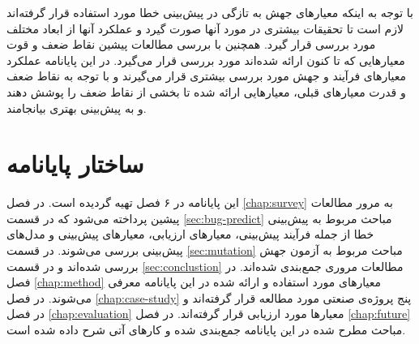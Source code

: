 با توجه به اینکه معیارهای جهش به تازگی در پیش‌بینی خطا مورد استفاده قرار گرفته‌اند لازم است تا تحقیقات بیشتری در مورد آنها صورت گیرد و عملکرد آنها از ابعاد مختلف مورد بررسی قرار گیرد. همچنین با بررسی مطالعات پیشین نقاط ضعف و قوت معیارهایی که تا کنون ارائه شده‌اند مورد بررسی قرار می‌گیرد. در این پایانامه عملکرد معیارهای فرآیند و جهش مورد بررسی بیشتری قرار می‌گیرند و با توجه به نقاط ضعف و قدرت معیارهای قبلی، معیارهایی ارائه شده تا بخشی از نقاط ضعف را پوشش دهند و به پیش‌بینی بهتری بیانجامند. 
\section{ساختار پایانامه}

این پایانامه در ۶ فصل تهیه گردیده است. در فصل \ref{chap:survey} به مرور مطالعات پیشین پرداخته می‌شود که در  قسمت \ref{sec:bug-predict}  مباحث مربوط به پیش‌بینی خطا از جمله فرآیند پیش‌بینی، معیارهای ارزیابی، معیارهای پیش‌بینی و مدل‌های پیش‌بینی بررسی می‌شوند. در قسمت \ref{sec:mutation} مباحث مربوط به آزمون جهش بررسی شده‌اند و در قسمت \ref{sec:conclustion} مطالعات مروری جمع‌بندی شده‌اند. در فصل \ref{chap:method} معیارهای مورد استفاده و ارائه شده در این پایانامه معرفی می‌شوند. در فصل \ref{chap:case-study} پنج پروژه‌ی صنعتی مورد مطالعه قرار گرفته‌اند و در فصل \ref{chap:evaluation} معیارها مورد ارزیابی قرار گرفته‌اند. در فصل \ref{chap:future} مباحث مطرح شده در این پایانامه جمع‌بندی شده و کارهای آتی شرح داده شده است. 
	
